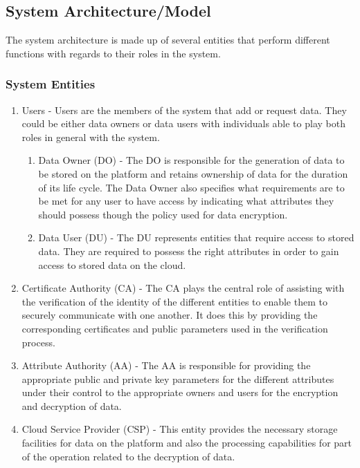 \subsection{System Architecture/Model}

The system architecture is made up of several entities that perform different functions with regards to their roles in the system.

\subsubsection*{System Entities}

\begin{enumerate}[label=(\arabic*)]
	\item Users - Users are the members of the system that add or request data. They could be either data owners or data users with individuals able to play both roles in general with the system.
	
	\begin{enumerate}
		\item Data Owner (DO) - The DO is responsible for the generation of data to be stored on the platform and retains ownership of data for the duration of its life cycle. The Data Owner also specifies what requirements are to be met for any user to have access by indicating what attributes they should possess though the policy used for data encryption.
		
		\item Data User (DU) - The DU represents entities that require access to stored data. They are required to possess the right attributes in order to gain access to stored data on the cloud.
	\end{enumerate}
	
	\item Certificate Authority (CA) - The CA plays the central role of assisting with the verification of the identity of the different entities to enable them to securely communicate with one another. It does this by providing the corresponding certificates and public parameters used in the verification process.
	
	\item Attribute Authority (AA) - The AA is responsible for providing the appropriate public and private key parameters for the different attributes under their control to the appropriate owners and users for the encryption and decryption of data. 
	
	\item Cloud Service Provider (CSP) - This entity provides the necessary storage facilities for data on the platform and also the processing capabilities for part of the operation related to the decryption of data.
	
\end{enumerate}

